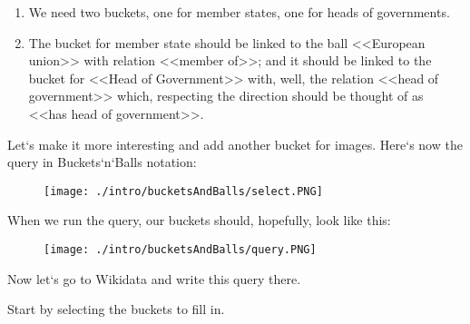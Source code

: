 \begin{enumerate}
    \item We need two buckets, one for member states, one for heads of governments.
    \item The bucket for member state should be linked to the ball <<European union>> with relation <<member of>>; and it should be linked to the bucket for <<Head of Government>> with, well, the relation <<head of government>> which, respecting the direction should be thought of as <<has head of government>>.
\end{enumerate}

Let`s make it more interesting and add another bucket for images. Here`s now the query in Buckets`n`Balls notation:

\begin{figure}[h!]
\texttt{[image: ./intro/bucketsAndBalls/select.PNG]}
\end{figure}

When we run the query, our buckets should, hopefully, look like this:

\begin{figure}[h!]
    \texttt{[image: ./intro/bucketsAndBalls/query.PNG]}
\end{figure}

Now let`s go to Wikidata and write this query there.

Start by selecting the buckets to fill in.
